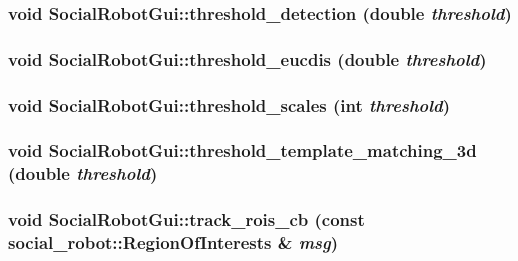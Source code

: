 \label{classSocialRobotGui_a2345763f68b3da1cff958a9a24218da6}
\hypertarget{classSocialRobotGui_a9931a08dd5eda16aa454d6edccdfb015}{
\subsubsection[{threshold\_\-detection}]{\setlength{\rightskip}{0pt plus 5cm}void SocialRobotGui::threshold\_\-detection (double {\em threshold})}}
\label{classSocialRobotGui_a9931a08dd5eda16aa454d6edccdfb015}
\hypertarget{classSocialRobotGui_ac701acad18c8d5d0358886765ba8abb9}{
\subsubsection[{threshold\_\-eucdis}]{\setlength{\rightskip}{0pt plus 5cm}void SocialRobotGui::threshold\_\-eucdis (double {\em threshold})}}
\label{classSocialRobotGui_ac701acad18c8d5d0358886765ba8abb9}
\hypertarget{classSocialRobotGui_a5f6fedb5046ca5cc46c021cca4778385}{
\subsubsection[{threshold\_\-scales}]{\setlength{\rightskip}{0pt plus 5cm}void SocialRobotGui::threshold\_\-scales (int {\em threshold})}}
\label{classSocialRobotGui_a5f6fedb5046ca5cc46c021cca4778385}
\hypertarget{classSocialRobotGui_a77d605da08f98863b272ccef00b42666}{
\subsubsection[{threshold\_\-template\_\-matching\_\-3d}]{\setlength{\rightskip}{0pt plus 5cm}void SocialRobotGui::threshold\_\-template\_\-matching\_\-3d (double {\em threshold})}}
\label{classSocialRobotGui_a77d605da08f98863b272ccef00b42666}
\hypertarget{classSocialRobotGui_a3333bd4377889eb97216ebfbb10f8104}{
\subsubsection[{track\_\-rois\_\-cb}]{\setlength{\rightskip}{0pt plus 5cm}void SocialRobotGui::track\_\-rois\_\-cb (const {\bf social\_\-robot::RegionOfInterests} \& {\em msg})}}
